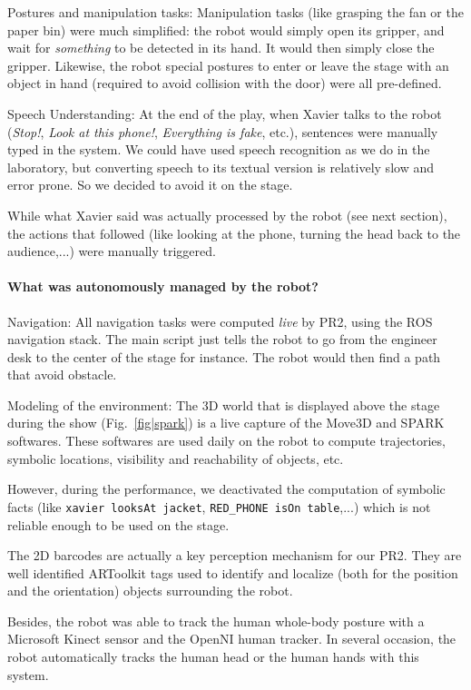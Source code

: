 Postures and manipulation tasks: Manipulation tasks (like grasping
the fan or the paper bin) were much simplified: the robot would simply open its
gripper, and wait for \emph{something} to be detected in its hand. It would
then simply close the gripper. Likewise, the robot special postures to enter or
leave the stage with an object in hand (required to avoid collision with the
door) were all pre-defined.

Speech Understanding: At the end of the play, when Xavier talks to
the robot (\emph{Stop!}, \emph{Look at this phone!}, \emph{Everything is fake},
etc.), sentences were manually typed in the system. We could have used speech
recognition as we do in the laboratory, but converting speech to its textual
version is relatively slow and error prone. So we decided to avoid it on the
stage.

While what Xavier said was actually processed by the robot (see next section),
the actions that followed (like looking at the phone, turning the head back to
the audience,...) were manually triggered.

\paragraph{What was autonomously managed by the robot?}

Navigation: All navigation tasks were computed \emph{live} by
PR2, using the ROS navigation stack. The main script just tells the robot to go
from the engineer desk to the center of the stage for instance. The robot would
then find a path that avoid obstacle.  

Modeling of the environment: The 3D world that is displayed above
the stage during the show (Fig.~\ref{fig|spark}) is a live capture of the
Move3D and SPARK softwares. These softwares are used daily on the robot to
compute trajectories, symbolic locations, visibility and reachability of
objects, etc.

However, during the performance, we deactivated the computation of symbolic
facts (like {\tt xavier looksAt jacket}, {\tt RED\_PHONE isOn table},...) which
is not reliable enough to be used on the stage.

The 2D barcodes are actually a key perception mechanism for our PR2. They are
well identified {\sc ARToolkit} tags used to identify and localize (both for the
position and the orientation) objects surrounding the robot.

Besides, the robot was able to track the human whole-body posture with a
Microsoft Kinect sensor and the {\sc OpenNI} human tracker. In several
occasion, the robot automatically tracks the human head or the human hands with
this system.

